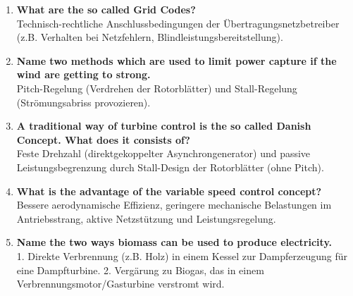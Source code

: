 \documentclass{article}
\begin{document}
\begin{enumerate}
    Der Stator ist direkt mit dem Netz verbunden. Der Rotor wird über einen Frequenzumrichter gespeist, wodurch die Anlage mit variabler Drehzahl betrieben werden kann, bei konstanter Netzfrequenz.
    \item \textbf{What are the so called Grid Codes?} \\
    Technisch-rechtliche Anschlussbedingungen der Übertragungsnetzbetreiber (z.B. Verhalten bei Netzfehlern, Blindleistungsbereitstellung).
    \item \textbf{Name two methods which are used to limit power capture if the wind are getting to strong.} \\
    Pitch-Regelung (Verdrehen der Rotorblätter) und Stall-Regelung (Strömungsabriss provozieren).
    \item \textbf{A traditional way of turbine control is the so called Danish Concept. What does it consists of?} \\
    Feste Drehzahl (direktgekoppelter Asynchrongenerator) und passive Leistungsbegrenzung durch Stall-Design der Rotorblätter (ohne Pitch).
    \item \textbf{What is the advantage of the variable speed control concept?} \\
    Bessere aerodynamische Effizienz, geringere mechanische Belastungen im Antriebsstrang, aktive Netzstützung und Leistungsregelung.
    \item \textbf{Name the two ways biomass can be used to produce electricity.} \\
    1. Direkte Verbrennung (z.B. Holz) in einem Kessel zur Dampferzeugung für eine Dampfturbine. 2. Vergärung zu Biogas, das in einem Verbrennungsmotor/Gasturbine verstromt wird.
\end{enumerate}
\end{document}
